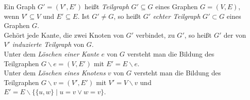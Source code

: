 Ein Graph $G'=(V',E')$ heißt \emph{Teilgraph} $G'\subseteq G$ eines Graphen $G=(V,E)$, wenn $V'\subseteq V$ und $E'\subseteq E$. Ist $G' \neq G$, so heißt $G'$ \emph{echter Teilgraph} $G'\subset G$ eines Graphen $G$.\\Gehört jede Kante, die zwei Knoten von $G'$ verbindet, zu $G'$, so heißt $G'$ der von $V'$ \emph{induzierte Teilgraph} von $G$.\\Unter dem \emph{Löschen einer Kante} $e$ von $G$ versteht man die Bildung des Teilgraphen $G \backslash e = (V, E')$ mit $E'=E  \backslash e$.\\Unter dem \emph{Löschen eines Knotens} $v$ von $G$ versteht man die Bildung des Teilgraphen $G \backslash v = (V', E')$ mit $V'=V  \backslash v$ und $E'=E \backslash \{\{u, w\}\;|\; u=v \vee w = v\}$.
